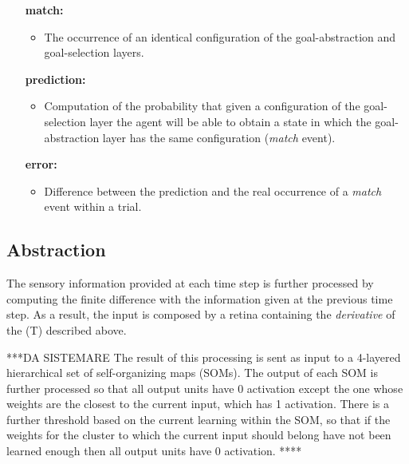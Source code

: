\documentclass[11pt]{article}
\begin{document}
\begin{itemize}[leftmargin=3cm]  

    \item[\textbf{match:}]

        \begin{itemize}

            \item The occurrence of an identical configuration of the
                goal-abstraction and goal-selection layers. 

        \end{itemize}    

    \item[\textbf{prediction:}]

        \begin{itemize}

            \item Computation of the probability that given a configuration of
                the goal-selection layer the agent will be able to obtain a state in which
                the goal-abstraction layer has the same configuration
                (\emph{match} event). 

        \end{itemize}  

    \item[\textbf{error:}]

        \begin{itemize}

            \item Difference between the prediction and the real occurrence of
                a \emph{match} event within a trial.

        \end{itemize}  

\end{itemize} 

\subsection{Abstraction}
\label{sec:abstraction}

The sensory information provided at each time step is further processed by computing the finite difference
with the information given at the previous time step. As a result, the
input is composed by a retina containing the \emph{derivative} of the
(T) described above.

***DA SISTEMARE
The result of this processing is sent as input to a 4-layered hierarchical set
of self-organizing maps (SOMs). The output of each SOM is further processed so
that all output units have 0 activation except the one whose weights are the
closest to the current input, which has 1 activation.  There is a further
threshold based on the current learning within the SOM, so that if the weights
for the cluster to which the current input should belong have not been learned
enough then all output units have 0 activation.
****
\end{document}
